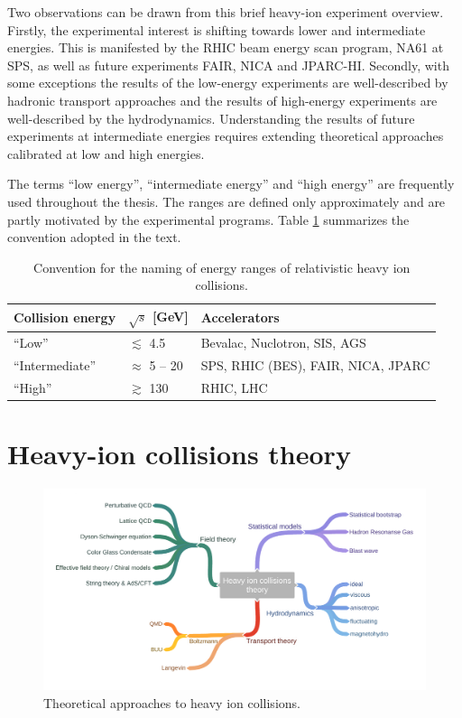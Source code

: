 Two observations can be drawn from this brief heavy-ion experiment overview.
Firstly, the experimental interest is shifting towards lower and intermediate
energies.  This is manifested by the RHIC beam energy scan program, NA61 at
SPS, as well as future experiments FAIR, NICA and JPARC-HI.  Secondly, with
some exceptions the results of the low-energy experiments are well-described by
hadronic transport approaches and the results of high-energy experiments are
well-described by the hydrodynamics. Understanding the results of future
experiments at intermediate energies requires extending theoretical approaches
calibrated at low and high energies.

The terms ``low energy'', ``intermediate energy'' and ``high energy'' are frequently
used throughout the thesis. The ranges are defined only approximately and are
partly motivated by the experimental programs. Table \ref{tab:energies_convention}
summarizes the convention adopted in the text.

\begin{table}
  \begin{tabular}{lll}
   \toprule
    Collision energy     &   $\sqrt{s}$ [GeV]  &   Accelerators \\
   \midrule
     ``Low''             &   $\lesssim$ 4.5    & Bevalac, Nuclotron, SIS, AGS \\
     ``Intermediate''    &   $\approx$ 5 -- 20 & SPS, RHIC (BES), FAIR, NICA, JPARC \\
     ``High''            &   $\gtrsim$ 130     & RHIC, LHC \\
   \bottomrule
  \end{tabular}
\caption{Convention for the naming of energy ranges of relativistic heavy ion
         collisions.}
\label{tab:energies_convention}
\end{table}

\section{Heavy-ion collisions theory} \label{sec:HI_th}

\begin{figure}
  \centering
  \includegraphics[width = \textwidth]{illustrations/intro_illustrations/Heavy_ion_collisionstheory.pdf}
  \caption{Theoretical approaches to heavy ion collisions.}
  \label{fig:HIC_th_mindmap}
\end{figure}


